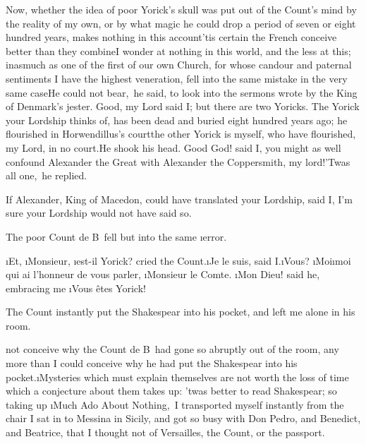 \documentclass[twoside]{article}
\begin{document}
Now, whether the idea of poor Yorick’s
skull was put out of the Count’s mind by
the reality of my own, or by what magic he
could drop a period of seven or eight
hundred years, makes nothing in this
account\tskk ’tis certain the French
conceive better than they combine\tskk I
wonder at nothing in this world, and the
less at this; inasmuch as one of the first
of our own Church, for whose candour and
paternal sentiments I have the highest
veneration, fell into the same mistake in
the very same case\tskk \lqq He could not
bear,\rqq\ he said, \lqq to look into the sermons
wrote by the King of Denmark’s jester.\rqq 
Good, my Lord said I; but there are two
Yoricks.  The Yorick your Lordship thinks
of, has been dead and buried eight hundred
years ago; he flourished in Horwendillus’s
court\tskk the other Yorick is myself,
who have flourished, my Lord, in no
court.\tskk He shook his head.  Good God!
said I, you might as well confound
Alexander the Great with Alexander the
Coppersmith, my lord!\tskk \lqq ’Twas all
one,\rqq\ he replied.\tskk 

\tskk If Alexander, King of Macedon, could
have translated your Lordship, said I, I’m
sure your Lordship would not have said so.

The poor Count de B\anon\ fell but into
the same \i{error}.

\tskk \i{Et}, \i{Monsieur}, \i{est-il
Yorick}? cried the Count.\tskk \i{Je le
suis}, said I.\tskk \i{Vous}?\tskk
\i{Moi}\tskk \i{moi qui ai l’honneur de
vous parler}, \i{Monsieur le Comte}.\tskk
\i{Mon Dieu}! said he, embracing me\tskk
\i{Vous êtes Yorick}!

The Count instantly put the Shakespear
into his pocket, and left me alone in his
room.





\vskip 6pt


 not conceive why the
Count de B\anon\ had gone so abruptly out
of the room, any more than I could
conceive why he had put the Shakespear
into his pocket.\tskk \i{Mysteries which
must explain themselves are not worth the
loss of time which a conjecture about them
takes up}: ’twas better to read
Shakespear; so taking up \lqq \i{Much Ado
About Nothing},\rqq\ I transported myself
instantly from the chair I sat in to
Messina in Sicily, and got so busy with
Don Pedro, and Benedict, and Beatrice,
that I thought not of Versailles, the
Count, or the passport.
\end{document}
